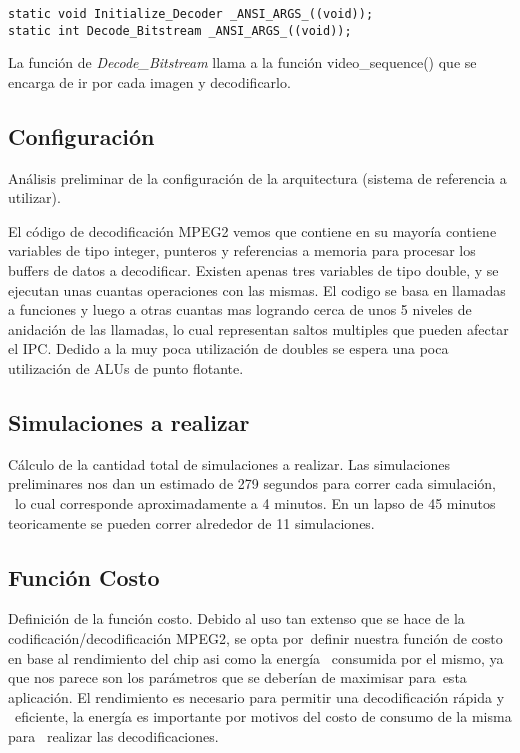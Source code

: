 \documentclass[journal]{IEEEtran}
\begin{document}
\footnotesize \begin{verbatim}
static void Initialize_Decoder _ANSI_ARGS_((void));
static int Decode_Bitstream _ANSI_ARGS_((void));
\end{verbatim}
\normalsize

La funci\'{o}n de \textit{Decode\_Bitstream} llama a la funci\'{o}n video\_sequence() que se encarga de ir por cada imagen y decodificarlo. \newline

\subsection{Configuraci\'{o}n}
An\'{a}lisis preliminar de la configuraci\'{o}n de la arquitectura (sistema de referencia a utilizar).

El c\'odigo de decodificaci\'on MPEG2 vemos que contiene en su mayor\'ia contiene variables de tipo integer, punteros y referencias a memoria para procesar los buffers de datos a decodificar. Existen apenas tres variables de tipo double, y se ejecutan unas cuantas operaciones con las mismas.  El codigo se basa en llamadas a funciones y luego a otras cuantas mas logrando cerca de unos 5 niveles de anidaci\'on de las llamadas, lo cual representan saltos multiples que pueden afectar el IPC.
Dedido a la muy poca utilizaci\'on de doubles se espera una poca utilizaci\'on de ALUs de punto flotante. \newline

\subsection{Simulaciones a realizar}
C\'{a}lculo de la cantidad total de simulaciones a realizar.
Las simulaciones preliminares nos dan un estimado de 279 segundos para correr cada simulaci\'{o}n, \
lo cual corresponde aproximadamente a 4 minutos.  En un lapso de 45 minutos teoricamente se pueden correr alrededor de 11 simulaciones.


\subsection{Funci\'{o}n Costo}
Definici\'{o}n de la funci\'{o}n costo.
Debido al uso tan extenso que se hace de la codificaci\'{o}n/decodificaci\'{o}n MPEG2, se opta por\
definir nuestra funci\'{o}n de costo en base al rendimiento del chip asi como la energ\'{i}a \
consumida por el mismo, ya que nos parece son los par\'{a}metros que se deber\'{i}an de maximisar para\
esta aplicaci\'{o}n.  El rendimiento es necesario para permitir una decodificaci\'{o}n r\'{a}pida y \
eficiente, la energ\'{i}a es importante por motivos del costo de consumo de la misma para \
realizar las decodificaciones.
\end{document}
